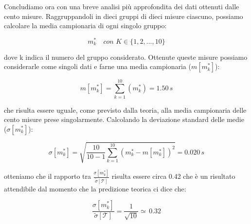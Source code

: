 Concludiamo ora con una breve analisi più approfondita dei dati ottenuti dalle cento
misure. Raggruppandoli in dieci gruppi di dieci misure ciascuno, possiamo calcolare
la media campionaria di ogni singolo gruppo:

\begin{equation*}
m_k^* \quad con \,\, K \in{\{1,2,...,10\}}
\end{equation*}

dove k indica il numero del gruppo considerato.
Ottenute queste misure possiamo considerarle come singoli dati e farne una media campionaria ($ m[m_k^*] $):

\begin{equation*}
m[m_k^*] = \sum_{k=1}^{10} (m_k^*) = 1.50\,s
\end{equation*}

che risulta essere uguale, come previsto dalla teoria, alla media campionaria delle cento
misure prese singolarmente. Calcolando la deviazione standard delle medie ($ \sigma[m_k^*] $):

\begin{equation*}
\sigma[m_k^*] = \sqrt{\frac{10}{10-1} \sum_{k=1}^{10} (m_k^* - m[m_k^*])^2} = 0.020\,s
\end{equation*}

otteniamo che il rapporto tra $\frac{\sigma[m_k^*]}{\tilde{\sigma}[\mathcal{T}]}$ risulta essere circa 0.42 che è un risultato attendibile dal momento che la predizione teorica ci dice che:

\begin{equation*}
\frac{\sigma[m_k^*]}{\tilde{\sigma}[\mathcal{T}]} = \frac{1}{\sqrt{10}} \simeq \, 0.32
\end{equation*}
